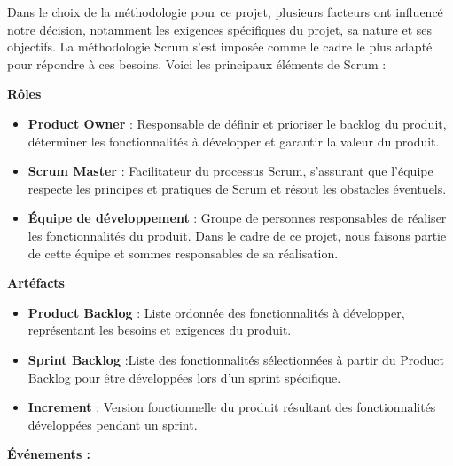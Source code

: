 \hspace{\parindent}Dans le choix de la méthodologie pour ce projet, plusieurs facteurs ont influencé notre décision, notamment les exigences spécifiques du projet, sa nature et ses objectifs. La méthodologie Scrum s'est imposée comme le cadre le plus adapté pour répondre à ces besoins. Voici les principaux éléments de Scrum :

\textbf{Rôles}


\begin{itemize}
    \item \textbf{Product Owner} : Responsable de définir et prioriser le backlog du produit, déterminer les fonctionnalités à développer et garantir la valeur du produit.

    \item \textbf{Scrum Master} : Facilitateur du processus Scrum, s'assurant que l'équipe respecte les principes et pratiques de Scrum et résout les obstacles éventuels.

    \item \textbf{Équipe de développement} : Groupe de personnes responsables de réaliser les fonctionnalités du produit. Dans le cadre de ce projet, nous faisons partie de cette équipe et sommes responsables de sa réalisation.
\end{itemize}



\textbf{Artéfacts}


\begin{itemize}
    \item \textbf{Product Backlog} : Liste ordonnée des fonctionnalités à développer, représentant les besoins et exigences du produit.

    \item \textbf{Sprint Backlog} :Liste des fonctionnalités sélectionnées à partir du Product Backlog pour être développées lors d'un sprint spécifique.

    \item \textbf{Increment} : Version fonctionnelle du produit résultant des fonctionnalités développées pendant un sprint.
\end{itemize}


\textbf{Événements :}


